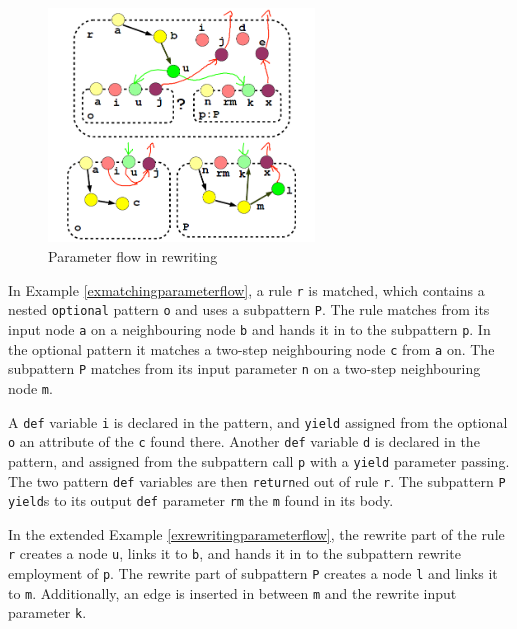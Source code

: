 \begin{figure}[hptb]
  \centering
  \includegraphics[width=0.63\textwidth]{fig/RewriteAndParameterFlowAnnotated}
  \caption{Parameter flow in rewriting}
  \label{figrewritingparameterflow}
\end{figure}

In Example \ref{exmatchingparameterflow}, a rule \texttt{r} is matched, which contains a nested \texttt{optional} pattern \texttt{o} and uses a subpattern \texttt{P}.
The rule matches from its input node \texttt{a} on a neighbouring node \texttt{b} and hands it in to the subpattern \texttt{p}.
In the optional pattern it matches a two-step neighbouring node \texttt{c} from \texttt{a} on.
The subpattern \texttt{P} matches from its input parameter \texttt{n} on a two-step neighbouring node \texttt{m}.

A \texttt{def} variable \texttt{i} is declared in the pattern, and \texttt{yield} assigned from the optional \texttt{o} an attribute of the \texttt{c} found there.
Another \texttt{def} variable \texttt{d} is declared in the pattern, and assigned from the subpattern call \texttt{p} with a \texttt{yield} parameter passing. 
The two pattern \texttt{def} variables are then \texttt{return}ed out of rule \texttt{r}.
The subpattern \texttt{P} \texttt{yield}s to its output \texttt{def} parameter \texttt{rm} the \texttt{m} found in its body.

In the extended Example \ref{exrewritingparameterflow}, the rewrite part of the rule \texttt{r} creates a node \texttt{u}, links it to \texttt{b}, and hands it in to the subpattern rewrite employment of \texttt{p}.
The rewrite part of subpattern \texttt{P} creates a node \texttt{l} and links it to \texttt{m}.
Additionally, an edge is inserted in between \texttt{m} and the rewrite input parameter \texttt{k}.

